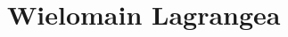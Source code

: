 \documentclass[]{article}
\author{Mateusz Kojro}
\begin{document}
\section{Wielomain Lagrangea}
\end{document}
